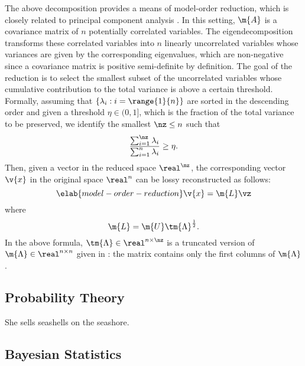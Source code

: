 The above decomposition provides a means of model-order reduction, which is
closely related to principal component analysis \cite{hastie2013}. In this
setting, $\m{A}$ is a covariance matrix of $n$ potentially correlated variables.
The eigendecomposition transforms these correlated variables into $n$ linearly
uncorrelated variables whose variances are given by the corresponding
eigenvalues, which are non-negative since a covariance matrix is positive
semi-definite by definition. The goal of the reduction is to select the smallest
subset of the uncorrelated variables whose cumulative contribution to the total
variance is above a certain threshold. Formally, assuming that $\{ \lambda_i: i
= \range{1}{n} \}$ are sorted in the descending order and given a threshold
$\eta \in (0, 1]$, which is the fraction of the total variance to be preserved,
we identify the smallest $\nz \leq n$ such that
\[
  \frac{\sum_{i = 1}^\nz \lambda_i}{\sum_{i = 1}^n \lambda_i} \geq \eta.
\]
Then, given a vector \vz in the reduced space $\real^\nz$, the corresponding
vector $\v{x}$ in the original space $\real^n$ can be lossy reconstructed as
follows:
\begin{equation} \elab{model-order-reduction}
  \v{x} = \m{L} \vz
\end{equation}
where
\[
  \m{L} = \m{U} \tm{\Lambda}^\frac{1}{2}.
\]
In the above formula, $\tm{\Lambda} \in \real^{n \times \nz}$ is a truncated
version of $\m{\Lambda} \in \real^{n \times n}$ given in
: the matrix contains only the first \nz columns of
$\m{\Lambda}$.

\subsection{Probability Theory}

She sells seashells on the seashore.

\subsection{Bayesian Statistics}

